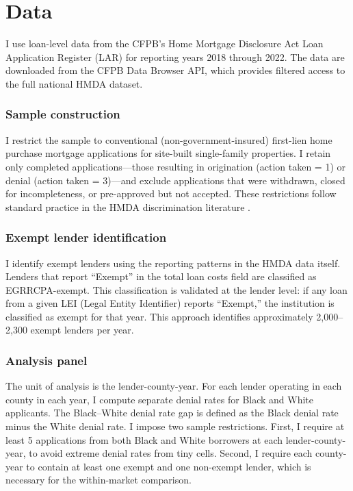 \documentclass[12pt]{article}
\begin{document}
\section{Data}

I use loan-level data from the CFPB's Home Mortgage Disclosure Act Loan Application Register (LAR) for reporting years 2018 through 2022. The data are downloaded from the CFPB Data Browser API, which provides filtered access to the full national HMDA dataset.

\subsubsection*{Sample construction} I restrict the sample to conventional (non-government-insured) first-lien home purchase mortgage applications for site-built single-family properties. I retain only completed applications---those resulting in origination (action taken = 1) or denial (action taken = 3)---and exclude applications that were withdrawn, closed for incompleteness, or pre-approved but not accepted. These restrictions follow standard practice in the HMDA discrimination literature \citep{munnell1996mortgage, bartlett2022consumer}.

\subsubsection*{Exempt lender identification} I identify exempt lenders using the reporting patterns in the HMDA data itself. Lenders that report ``Exempt'' in the total loan costs field are classified as EGRRCPA-exempt. This classification is validated at the lender level: if any loan from a given LEI (Legal Entity Identifier) reports ``Exempt,'' the institution is classified as exempt for that year. This approach identifies approximately 2,000--2,300 exempt lenders per year.

\subsubsection*{Analysis panel} The unit of analysis is the lender-county-year. For each lender operating in each county in each year, I compute separate denial rates for Black and White applicants. The Black--White denial rate gap is defined as the Black denial rate minus the White denial rate. I impose two sample restrictions. First, I require at least 5 applications from both Black and White borrowers at each lender-county-year, to avoid extreme denial rates from tiny cells. Second, I require each county-year to contain at least one exempt and one non-exempt lender, which is necessary for the within-market comparison.
\end{document}

